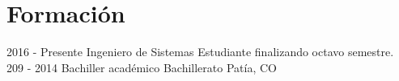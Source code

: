 \documentclass[american]{cv-class}
\begin{document}
\section{Formación}
\begin{entrylist}
	\entry
	{2016 - Presente}
	{Ingeniero de Sistemas }
	{ }
	{\justifying Estudiante finalizando octavo semestre.
	}
	\\
	\entry
	{209 - 2014}
	{Bachiller académico }
	{ \raisebox{-1.5ex} {Bachillerato Patía, CO}}
	{\justifying 
	}
	\end{entrylist}
\end{document}
